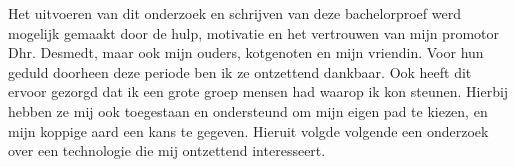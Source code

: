 \bigbreak{}

Het uitvoeren van dit onderzoek en schrijven van deze bachelorproef werd mogelijk gemaakt door de hulp, motivatie en het vertrouwen van mijn promotor Dhr. Desmedt, maar ook mijn ouders, kotgenoten en mijn vriendin. Voor hun geduld doorheen deze periode ben ik ze ontzettend dankbaar. Ook heeft dit ervoor gezorgd dat ik een grote groep mensen had waarop ik kon steunen. Hierbij hebben ze mij ook toegestaan en ondersteund om mijn eigen pad te kiezen, en mijn koppige aard een kans te gegeven. Hieruit volgde volgende een onderzoek over een technologie die mij ontzettend interesseert.